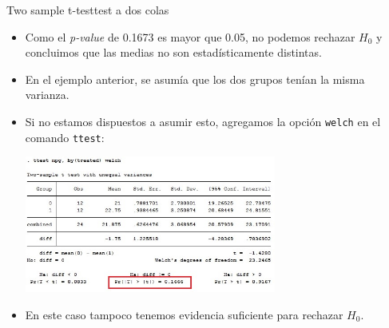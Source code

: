 \documentclass{beamer}
\begin{document}
\begin{frame}[allowframebreaks]{Two sample t-test}{test a dos colas}
\begin{center}
\end{center}
\begin{itemize}
\item Como el \textit{p-value} de 0.1673 es mayor que 0.05, no podemos rechazar $H_{0}$ y concluimos que las medias no son estadísticamente distintas.
\end{itemize}
\begin{itemize}
\item En el ejemplo anterior, se asumía que los dos grupos tenían la misma varianza. 
\item Si no estamos dispuestos a asumir esto, agregamos la opción \texttt{welch} en el comando \texttt{ttest}: \\
\begin{center}
\includegraphics[height=4.5cm]{ttest2.jpg}
\end{center}
\item En este caso tampoco tenemos evidencia suficiente para rechazar $H_{0}$.
\end{itemize}
\end{frame}
\end{document}
